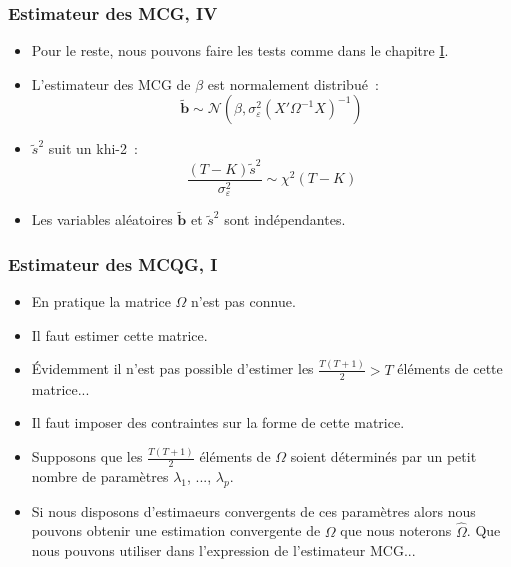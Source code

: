 \documentclass[10pt]{beamer}
\theoremstyle{plain}
\begin{document}
\begin{frame}
  \frametitle{Estimateur des MCG, IV}

  \begin{itemize}

  \item Pour le reste, nous pouvons faire les tests comme dans le chapitre \href{https://le-mans.adjemian.eu/econometrics/chapitre-1.pdf}{I}.\newline

  \item L'estimateur des MCG de $\beta$ est normalement distribué~:
    \[
      \tilde{\mathbf b} \sim \mathcal N\left(\beta, \sigma_{\varepsilon}^2\left(X'\Omega^{-1} X \right)^{-1} \right)
    \]
    \medskip

  \item $\tilde{s}^2$ suit un khi-2~:
    \[
      \frac{(T-K)\tilde{s}^2}{\sigma_{\varepsilon}^2} \sim \chi^2(T-K)
    \]
    \medskip

  \item Les variables aléatoires $\tilde{\mathbf b}$ et $\tilde{s}^2$ sont indépendantes.
  \end{itemize}


\end{frame}


\begin{frame}
  \frametitle{Estimateur des MCQG, I}

  \begin{itemize}

  \item En pratique la matrice $\Omega$ n'est pas connue.\newline

  \item Il faut estimer cette matrice.\newline

  \item Évidemment il n'est pas possible d'estimer les $\frac{T(T+1)}{2}>T$ éléments de cette matrice...\newline

  \item Il faut imposer des contraintes sur la forme de cette matrice.\newline

  \item Supposons que les $\frac{T(T+1)}{2}$ éléments de $\Omega$ soient déterminés par un petit nombre de paramètres $\lambda_1$, ..., $\lambda_p$.\newline

  \item Si nous disposons d'estimaeurs convergents de ces paramètres alors nous pouvons obtenir une estimation convergente de $\Omega$ que nous noterons $\widehat \Omega$. Que nous pouvons utiliser dans l'expression de l'estimateur MCG...

  \end{itemize}

\end{frame}
\end{document}
